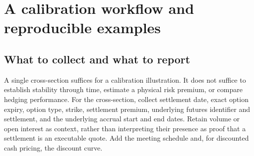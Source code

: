 \section{A calibration workflow and reproducible examples}\label{sec:calibration}
\subsection{What to collect and what to report}
A single cross-section suffices for a calibration illustration. It does not suffice to establish stability through time, estimate a physical risk premium, or compare hedging performance. For the cross-section, collect settlement date, exact option expiry, option type, strike, settlement premium, underlying futures identifier and settlement, and the underlying accrual start and end dates. Retain volume or open interest as context, rather than interpreting their presence as proof that a settlement is an executable quote. Add the meeting schedule and, for discounted cash pricing, the discount curve.

